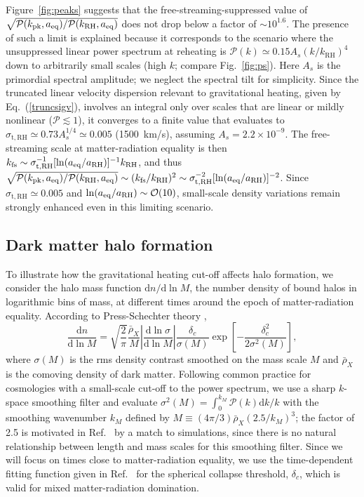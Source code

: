 \documentclass[a4paper,11pt]{article}
\newcommand{\rh}[1]{{#1}_{\mathrm{RH}}}
\newcommand{\kfs}{k_{\rm fs}}
\newcommand{\aeq}{a_{\rm eq}}
\newcommand{\diff}{\ensuremath{\mathrm{d}}}
\begin{document}
Figure~\ref{fig:peaks} suggests that the free-streaming-suppressed value of $\sqrt{\mathcal{P}(k_{\rm pk},\aeq) / \mathcal{P}(\rh{k},\aeq) }$ does not drop below a factor of $\sim 10^{1.6}$. The presence of such a limit is explained because it corresponds to the scenario where the unsuppressed linear power spectrum at reheating is $\mathcal{P}(k)\simeq 0.15 A_s (k/\rh{k})^4$ down to arbitrarily small scales (high $k$; compare Fig.~\ref{fig:ps}). Here $A_s$ is the primordial spectral amplitude; we neglect the spectral tilt for simplicity. Since the truncated linear velocity dispersion relevant to gravitational heating, given by Eq.~(\ref{truncsigv}), involves an integral only over scales that are linear or mildly nonlinear ($\mathcal{P}\lesssim 1$), it converges to a finite value that evaluates to $\sigma_\mathrm{t,RH}\simeq 0.73 A_s^{1/4}\simeq 0.005$ (1500~km/s), assuming $A_s=2.2\times 10^{-9}$.
The free-streaming scale at matter-radiation equality is then $\kfs\sim \sigma_\mathrm{t,RH}^{-1}[\ln(\aeq/\rh{a})]^{-1}\rh{k}$, and thus $\sqrt{\mathcal{P}(k_{\rm pk},\aeq) / \mathcal{P}(\rh{k},\aeq) }\sim (\kfs/\rh{k})^2\sim \sigma_\mathrm{t,RH}^{-2}[\ln(\aeq/\rh{a})]^{-2}$.
Since $\sigma_\mathrm{t,RH}\simeq 0.005$ and $\ln(\aeq/\rh{a})\sim\mathcal{O}(10)$, small-scale density variations remain strongly enhanced even in this limiting scenario.




\subsection{Dark matter halo formation}


To illustrate how the gravitational heating cut-off affects halo formation, we consider the halo mass function $\diff n / \diff \ln M$, the number density of bound halos in logarithmic bins of mass, at different times around the epoch of matter-radiation equality. According to Press-Schechter theory \cite{press-schechter},
\begin{equation}
    \frac{\diff n}{\diff \ln M} =
    \sqrt{\frac{2}{\pi}}
    \frac{\bar{\rho}_X}{M}
    \left| \frac{\diff \ln \sigma}{\diff \ln M} \right|
    \frac{\delta_c}{\sigma(M)}
    \exp \left[- \frac{\delta_c^2}{2 \sigma^2(M)} \right],
\end{equation}
where $\sigma(M)$ is the rms density contrast smoothed on the mass scale $M$ and $\bar{\rho}_X$ is the comoving density of dark matter.
Following common practice for cosmologies with a small-scale cut-off to the power spectrum, we use a sharp $k$-space smoothing filter and evaluate
$\sigma^2(M) = \int_0^{k_M} \mathcal{P}(k) \diff k/k$
with the smoothing wavenumber $k_M$ defined by $M \equiv (4\pi/3)\bar{\rho}_X (2.5/k_M)^3$; the factor of 2.5 is motivated in Ref.~\cite{benson12} by a match to simulations, since there is no natural relationship between length and mass scales for this smoothing filter.
Since we will focus on times close to matter-radiation equality, we use the time-dependent fitting function given in Ref.~\cite{blanco19} for the spherical collapse threshold, $\delta_c$, which is valid for mixed matter-radiation domination.
\end{document}
